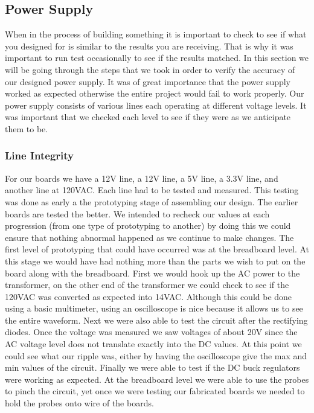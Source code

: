 \subsection{Power Supply}
When in the process of building something it is important to check to see if
what you designed for is similar to the results you are receiving. That is why
it was important to run test occasionally to see if the results matched. In this
section we will be going through the steps that we took in order to
verify the accuracy of our designed power supply. It was of great importance
that the power supply worked as expected otherwise the entire project would fail
to work properly. Our power supply consists of various lines each operating at
different voltage levels. It was important that we checked each level to see if
they were as we anticipate them to be.

\subsubsection{Line Integrity}
For our boards we have a 12V line, a 12V line, a 5V line, a 3.3V line, and
another line at 120VAC. Each line had to be tested and measured.
This testing was done as early a the prototyping stage of assembling
our design.  The earlier boards are tested the better. We intended to
recheck our values at each progression (from one type of prototyping to
another) by doing this we could ensure that nothing abnormal happened as we continue to
make changes. The first level of prototyping that could have occurred was at the breadboard
level. At this stage we would have had nothing more than the parts we wish to put on the
board along with the breadboard. First we would hook up the AC power to the
transformer, on the other end of the transformer we could check to see if the
120VAC was converted as expected into 14VAC. Although this could be done using
a basic multimeter, using an oscilloscope is nice because it allows us to see
the entire waveform. Next we were also able to test the circuit after the rectifying diodes.
Once the voltage was measured we saw voltages of about 20V
since the AC voltage level does not translate exactly into the DC values. At
this point we could see what our ripple was, either by having the oscilloscope give the max and min values of the circuit. Finally we were able to test if the DC buck regulators were working as expected. At the
breadboard level we were able to use the probes to pinch the circuit, yet once we were
testing our fabricated boards we needed to hold the probes onto
wire of the boards.


